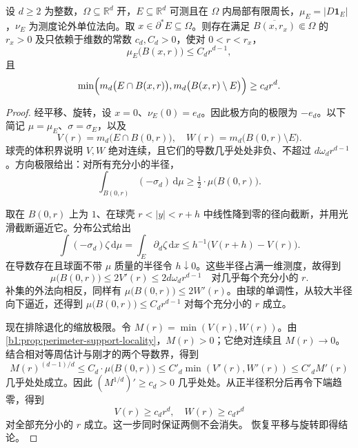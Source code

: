 \begin{lemma}[约化点附近的周长与两侧体积估计]
\label{b1:lem:reduced-boundary-scale-estimates}
设 \(d\ge2\) 为整数，\(\Omega\subseteq\mathbb R^d\) 开，\(E\subseteq\mathbb R^d\) 可测且在 \(\Omega\) 内局部有限周长，\(\mu_E=|D\mathbf1_E|\)，\(\nu_E\) 为测度论外单位法向。取 \(x\in\partial^*E\subseteq\Omega\)。则存在满足 \(\overline{B(x,r_x)}\Subset\Omega\) 的 \(r_x>0\) 及只依赖于维数的常数 \(c_d,C_d>0\)，使对 \(0<r<r_x\)，
\[
 \mu_E\bigl(B(x,r)\bigr)\le C_dr^{d-1},
\]
且
\[
 \min\Bigl(m_d\bigl(E\cap B(x,r)\bigr),
            m_d\bigl(B(x,r)\setminus E\bigr)\Bigr)
 \ge c_dr^d.
\]
\end{lemma}
\begin{proof}
经平移、旋转，设 \(x=0\)、\(\nu_E(0)=e_d\)。因此极方向的极限为 \(-e_d\)。以下简记 \(\mu=\mu_E\)、\(\sigma=\sigma_E\)，以及
\[
 V(r)=m_d\bigl(E\cap B(0,r)\bigr),\quad
 W(r)=m_d\bigl(B(0,r)\setminus E\bigr).
\]
球壳的体积界说明 \(V,W\) 绝对连续，且它们的导数几乎处处非负、不超过 \(d\omega_dr^{d-1}\)。方向极限给出：对所有充分小的半径，
\[
 \int_{B(0,r)}(-\sigma_d)\,\mathrm d\mu
 \ge\tfrac12\cdot \mu\bigl(B(0,r)\bigr).
\]

取在 \(B(0,r)\) 上为 \(1\)、在球壳 \(r<|y|<r+h\) 中线性降到零的径向截断，并用光滑截断逼近它。分布公式给出
\[
 \int(-\sigma_d)\zeta\,\mathrm d\mu
 =\int_E\partial_d\zeta\,\mathrm dx
 \le h^{-1}\bigl(V(r+h)-V(r)\bigr).
\]
在导数存在且球面不带 \(\mu\) 质量的半径令 \(h\downarrow0\)。这些半径占满一维测度，故得到
\begin{equation}\label{b1:eq:reduced-perimeter-radial-bound}
 \mu\bigl(B(0,r)\bigr)\le2V'(r)\le2d\omega_dr^{d-1}
 \quad\text{对几乎每个充分小的 }r.
\end{equation}
补集的外法向相反，同样有 \(\mu\bigl(B(0,r)\bigr)\le2W'(r)\)。由球的单调性，从较大半径向下逼近，还得到
\(\mu\bigl(B(0,r)\bigr)\le C_dr^{d-1}\)
对每个充分小的 \(r\) 成立。

现在排除退化的缩放极限。令 \(M(r)=\min(V(r),W(r))\)。由\cref{b1:prop:perimeter-support-locality}，\(M(r)>0\)；它绝对连续且 \(M(r)\to0\)。结合相对等周估计与刚才的两个导数界，得到
\[
 M(r)^{(d-1)/d}
 \le C_d\cdot \mu\bigl(B(0,r)\bigr)
 \le C'_d\min(V'(r),W'(r))
 \le C'_d M'(r)
\]
几乎处处成立。因此 \((M^{1/d})'\ge c_d>0\) 几乎处处。从正半径积分后再令下端趋零，得到
\begin{equation}\label{b1:eq:reduced-two-sided-volume}
 V(r)\ge c_dr^d,\quad W(r)\ge c_dr^d
\end{equation}
对全部充分小的 \(r\) 成立。这一步同时保证两侧不会消失。
恢复平移与旋转即得结论。
\end{proof}


